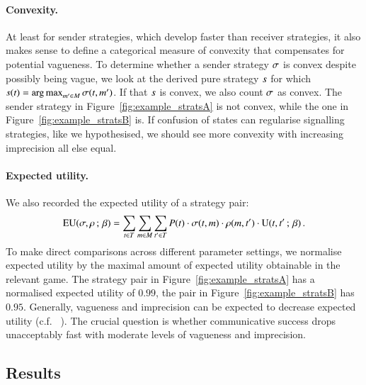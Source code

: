 \documentclass[11pt,english]{article}
\newcommand{\toler}{\ensuremath{\beta}} %
\renewcommand{\Pr}{\ensuremath{P}}
\numberwithin{equation}{section}
\newcommand{\citepbjpspre}[2]{(#1~\citeauthor{#2} \citeyear{#2})}
\begin{document}
\paragraph{Convexity.} At least for sender strategies, which develop faster than receiver
strategies, it also makes sense to define a categorical measure of convexity that compensates
for potential vagueness. To determine whether a sender strategy $\sigma$ is convex despite
possibly being vague, we look at the derived pure strategy $s$ for which
$s(t) = \operatorname*{arg\,max}_{m' \in M} \sigma(t,m')$. If that $s$ is
convex, we also count $\sigma$ as convex. The sender strategy in
Figure~\ref{fig:example_stratsA} is not convex, while the one in
Figure~\ref{fig:example_stratsB} is.  If confusion of states can regularise signalling
strategies, like we hypothesised, we should see more convexity with increasing imprecision all
else equal.

\paragraph{Expected utility.} We also recorded the expected utility of
a strategy pair:
\begin{align*}
  \EU(\Sstrat,\Rstrat \myts ; \myts \toler) = \sum_{\state \in
    \States} \sum_{\messg \in \Messgs} \sum_{\state' \in \States}
  \Pr(\state) \cdot \Sstrat(\state, \messg) \cdot \Rstrat(\messg,
  \state') \cdot \Util(\state,\state' \myts ; \myts \toler)\,.
\end{align*}
To make direct comparisons across different parameter settings, we
normalise expected utility by the maximal amount of expected utility
obtainable in the relevant game. The strategy pair in
Figure~\ref{fig:example_stratsA} has a normalised expected utility of
$0.99$, the pair in Figure~\ref{fig:example_stratsB} has
$0.95$. Generally, vagueness and imprecision can be expected to
decrease expected utility
\citepbjpspre{c.f.}{Lipman2009:Why-is-Language}. The crucial question is
whether communicative success drops unacceptably fast with moderate
levels of vagueness and imprecision.

\subsection{Results}
\end{document}

